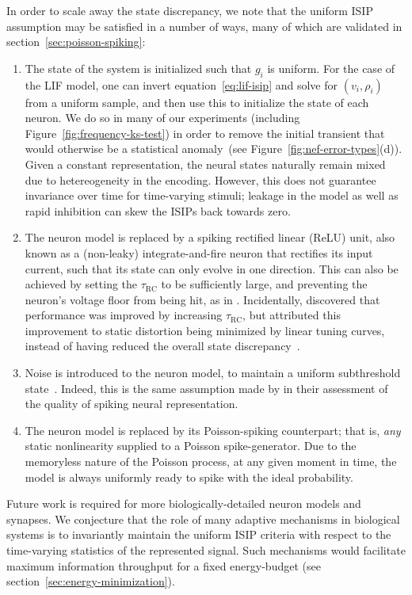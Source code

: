 In order to scale away the state discrepancy, we note that the uniform ISIP assumption may be satisfied in a number of ways, many of which are validated in
section~\ref{sec:poisson-spiking}:
\begin{enumerate}
\item The state of the system is initialized such that $g_i$ is uniform.
For the case of the LIF model, one can invert equation~\ref{eq:lif-isip} and solve for $(v_i, \rho_i)$ from a uniform sample, and then use this to initialize the state of each neuron.
We do so in many of our experiments (including Figure~\ref{fig:frequency-ks-test}) in order to remove the initial transient that would otherwise be a statistical anomaly~(see Figure~\ref{fig:nef-error-types}(d)).
Given a constant representation, the neural states naturally remain mixed due to hetereogeneity in the encoding.
However, this does not guarantee invariance over time for time-varying stimuli; leakage in the model as well as rapid inhibition can skew the ISIPs back towards zero.

\item The neuron model is replaced by a spiking rectified linear (ReLU) unit, also known as a (non-leaky) integrate-and-fire neuron that rectifies its input current, such that its state can only evolve in one direction.
This can also be achieved by setting the $\tau_\text{RC}$ to be sufficiently large, and preventing the neuron's voltage floor from being hit, as in \citet{boerlin2013predictive}.
Incidentally, \citet[][pp.~238--239]{eliasmith2003a} discovered that performance was improved by increasing $\tau_\text{RC}$, but attributed this improvement to static distortion being minimized by linear tuning curves, instead of having reduced the overall state discrepancy~\citep[also see][Appendix~F.1]{eliasmith2003a}.

\item Noise is introduced to the neuron model, to maintain a uniform subthreshold state~\citep[][pp.~132--133]{eliasmith2003a}.
Indeed, this is the same assumption made by \citet[][p.~134]{eliasmith2003a} in their assessment of the quality of spiking neural representation.

\item The neuron model is replaced by its Poisson-spiking counterpart; that is, \emph{any} static nonlinearity supplied to a Poisson spike-generator.
Due to the memoryless nature of the Poisson process, at any given moment in time, the model is always uniformly ready to spike with the ideal probability.

\end{enumerate}
Future work is required for more biologically-detailed neuron models and synapses.
We conjecture that the role of many adaptive mechanisms in biological systems is to invariantly maintain the uniform ISIP criteria with respect to the time-varying statistics of the represented signal.
Such mechanisms would facilitate maximum information throughput for a fixed energy-budget (see section~\ref{sec:energy-minimization}).

